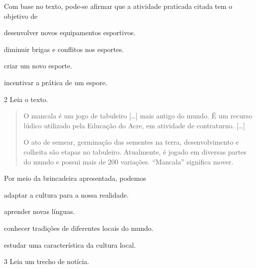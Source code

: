 \noindent{}Com base no texto, pode-se afirmar que a atividade praticada citada tem o objetivo de

\begin{escolha}
\item desenvolver novos equipamentos esportivos.

\item diminuir brigas e conflitos nos esportes.

\item criar um novo esporte.

\item incentivar a prática de um espore.
\end{escolha}



\num{2} Leia o texto.

\begin{quote}
O mancala é um jogo de tabuleiro {[}\ldots{}{]} mais antigo do mundo. É um
recurso lúdico utilizado pela Educação do Acre, em atividade
de contraturno. {[}\ldots{}{]}

O ato de semear, germinação das sementes na terra, desenvolvimento e
colheita são etapas no tabuleiro. Atualmente, é jogado em diversas
partes do mundo e possui mais de 200 variações. “Mancala” significa
mover.

\end{quote} \enlargethispage{\baselineskip}

\noindent{}Por meio da brincadeira apresentada, podemos

\begin{escolha}
\item adaptar a cultura para a nossa realidade.

\item aprender novas línguas.

\item conhecer tradições de diferentes locais do mundo.

\item estudar uma característica da cultura local.
\end{escolha}



\num{3} Leia um trecho de notícia.

